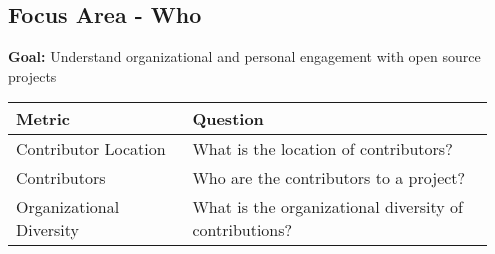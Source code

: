 
\subsection{Focus Area - Who}
\textbf{Goal:} Understand organizational and personal engagement with open source projects
\begin{table}[ht!]
    \centering
    \begin{tabular}{|p{0.35\linewidth} | p{0.6\linewidth}|}
        \hline
        \hfil \textbf{Metric}  & \hfil \textbf{Question} \\
        \hline
		Contributor Location & What is the location of contributors? \\ 
		\hline
		Contributors & Who are the contributors to a project? \\ 
		\hline
		Organizational Diversity & What is the organizational diversity of contributions? \\ 
		\hline
    \end{tabular}
\end{table}

 
 
 
